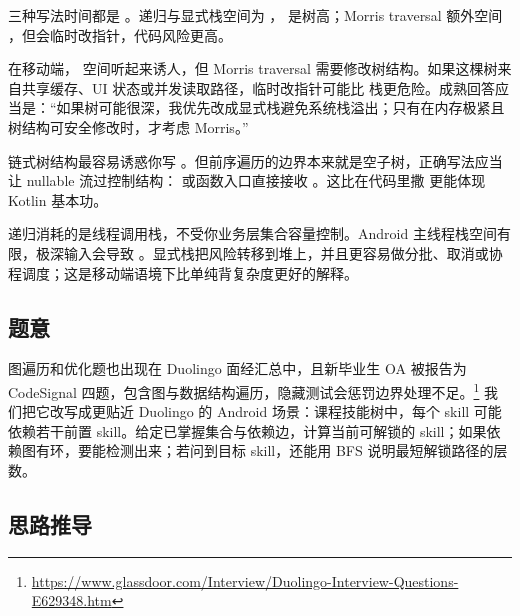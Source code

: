 \begin{keypoint}[复杂度]
三种写法时间都是 。递归与显式栈空间为 ， 是树高；Morris traversal 额外空间 ，但会临时改指针，代码风险更高。
\end{keypoint}

\begin{idea}[优化不是永远追求最省空间]
在移动端， 空间听起来诱人，但 Morris traversal 需要修改树结构。如果这棵树来自共享缓存、UI 状态或并发读取路径，临时改指针可能比  栈更危险。成熟回答应当是：“如果树可能很深，我优先改成显式栈避免系统栈溢出；只有在内存极紧且树结构可安全修改时，才考虑 Morris。”
\end{idea}

\begin{pitfall}
链式树结构最容易诱惑你写 。但前序遍历的边界本来就是空子树，正确写法应当让 nullable 流过控制结构： 或函数入口直接接收 。这比在代码里撒 \code{!!} 更能体现 Kotlin 基本功。
\end{pitfall}

\begin{followup}
递归消耗的是线程调用栈，不受你业务层集合容量控制。Android 主线程栈空间有限，极深输入会导致 。显式栈把风险转移到堆上，并且更容易做分批、取消或协程调度；这是移动端语境下比单纯背复杂度更好的解释。
\end{followup}


\subsection*{题意}

图遍历和优化题也出现在 Duolingo 面经汇总中，且新毕业生 OA 被报告为 CodeSignal 四题，包含图与数据结构遍历，隐藏测试会惩罚边界处理不足。\srccommunity\footnote{\url{https://www.glassdoor.com/Interview/Duolingo-Interview-Questions-E629348.htm}} 我们把它改写成更贴近 Duolingo 的 Android 场景：课程技能树中，每个 skill 可能依赖若干前置 skill。给定已掌握集合与依赖边，计算当前可解锁的 skill；如果依赖图有环，要能检测出来；若问到目标 skill，还能用 BFS 说明最短解锁路径的层数。

\subsection*{思路推导}

